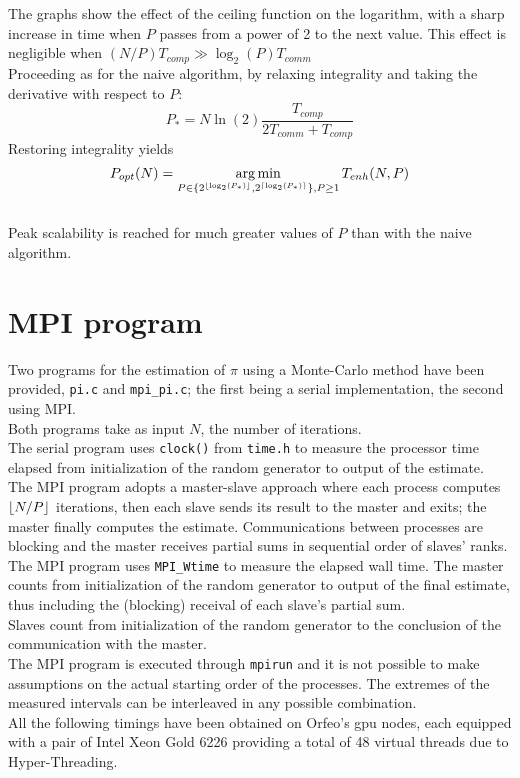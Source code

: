 \documentclass[a4paper, 11pt]{article}
\DeclareMathOperator*{\argmin}{arg\,min}
\DeclarePairedDelimiter{\ceil}{\lceil}{\rceil}
\DeclarePairedDelimiter{\floor}{\lfloor}{\rfloor}
\begin{document}
The graphs show the effect of the ceiling function on the logarithm, with a sharp increase in time when $P$ passes from a power of 2 to the next value. This effect is negligible when $(N/P)T_{comp} \gg \log_{2}(P)T_{comm}$ \\
Proceeding as for the naive algorithm, by relaxing integrality and taking the derivative with respect to $P$:
$$P_{*} = N\ln(2)\frac{T_{comp}}{2T_{comm} + T_{comp}}$$
Restoring integrality yields
$$P_{opt}(N) = \argmin_{P \in \{ 2^{\floor{\log_2(P_{*})}}, 2^{\ceil{\log_2(P_{*})}} \}, P \geq 1}{T_{enh}(N, P)} $$\\
Peak scalability is reached for much greater values of $P$ than with the naive algorithm.\\
\section{MPI program}
Two programs for the estimation of $\pi$ using a Monte-Carlo method have been provided, \texttt{pi.c} and \texttt{mpi\_pi.c}; the first being a serial implementation, the second using MPI.\\
Both programs take as input $N$, the number of iterations.\\
The serial program uses \texttt{clock()} from \texttt{time.h} to measure the processor time elapsed from initialization of the random generator to output of the estimate.\\
The MPI program adopts a master-slave approach where each process computes $\floor{N/P}$ iterations, then each slave sends its result to the master and exits; the master finally computes the estimate. Communications between processes are blocking and the master receives partial sums in sequential order of slaves' ranks.\\
The MPI program uses \texttt{MPI\_Wtime} to measure the elapsed wall time. The master counts from initialization of the random generator to output of the final estimate, thus including the (blocking) receival of each slave's partial sum.\\
Slaves count from initialization of the random generator to the conclusion of the communication with the master.\\
The MPI program is executed through \texttt{mpirun} and it is not possible to make assumptions on the actual starting order of the processes. The extremes of the measured intervals can be interleaved in any possible combination.\\
All the following timings have been obtained on Orfeo's gpu nodes, each equipped with a pair of Intel Xeon Gold 6226 providing a total of 48 virtual threads due to Hyper-Threading.
\end{document}
